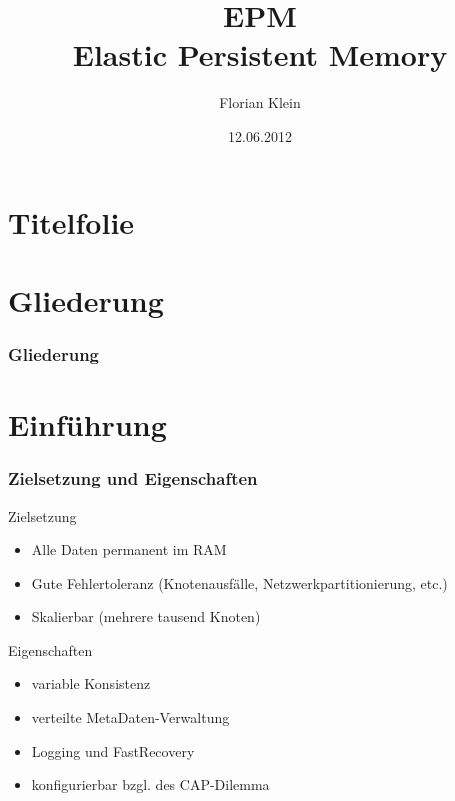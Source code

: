 \documentclass{beamer}
\title[EPM]{EPM\\Elastic Persistent Memory}
\author{Florian Klein}
\institute[Universität Düsseldorf] {Institut für Informatik\\Abteilung Betriebssysteme\\Heinrich-Heine-Universität Düsseldorf}
\date{12.06.2012}
\begin{document}
\section*{Titelfolie}

	\begin{frame}
		\titlepage
	\end{frame}

\section*{Gliederung}

	\begin{frame}
		\frametitle{Gliederung}

		\tableofcontents[hideallsubsections]
	\end{frame}

\section{Einführung}

	\begin{frame}
		\frametitle{Zielsetzung und Eigenschaften}

		\begin{block}{Zielsetzung}
			\begin{itemize}
				\item Alle Daten permanent im RAM
				\item Gute Fehlertoleranz (Knotenausfälle, Netzwerkpartitionierung, etc.)
				\item Skalierbar (mehrere tausend Knoten)
			\end{itemize}
		\end{block}

		\begin{block}{Eigenschaften}
			\begin{itemize}
				\item variable Konsistenz
				\item verteilte MetaDaten-Verwaltung
				\item Logging und FastRecovery
				\item konfigurierbar bzgl. des CAP-Dilemma
			\end{itemize}
		\end{block}
	\end{frame}
\end{document}
